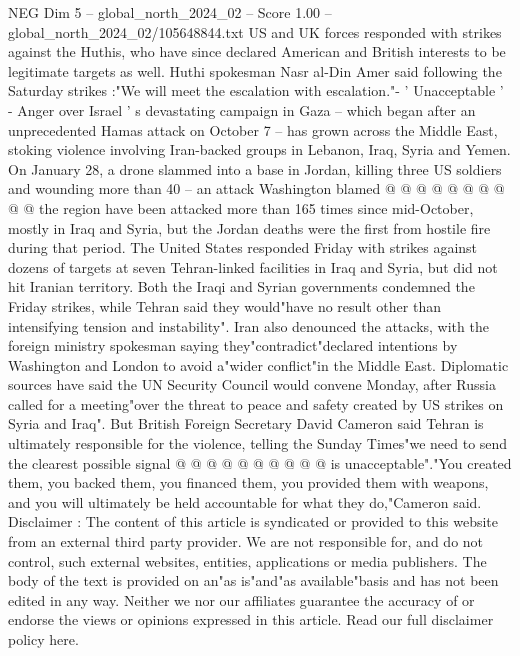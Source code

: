 \begin{textsample}{NEG Dim 5 – global\_north\_2024\_02 – Score 1.00 – global\_north\_2024\_02/105648844.txt}
US and UK forces responded with strikes against the Huthis, who have since declared American and British interests to be legitimate targets as well.
Huthi spokesman Nasr al-Din Amer said following the Saturday strikes :"We will meet the escalation with escalation."- ' Unacceptable ' - Anger over Israel ' s devastating campaign in Gaza -- which began after an unprecedented Hamas attack on October 7 -- has grown across the Middle East, stoking violence involving Iran-backed groups in Lebanon, Iraq, Syria and Yemen.
On January 28, a drone slammed into a base in Jordan, killing three US soldiers and wounding more than 40 -- an attack Washington blamed @ @ @ @ @ @ @ @ @ @ the region have been attacked more than 165 times since mid-October, mostly in Iraq and Syria, but the Jordan deaths were the first from hostile fire during that period.
The United States responded Friday with strikes against dozens of targets at seven Tehran-linked facilities in Iraq and Syria, but did not hit Iranian territory.
Both the Iraqi and Syrian governments condemned the Friday strikes, while Tehran said they would"have no result other than intensifying tension and instability".
Iran also denounced the attacks, with the foreign ministry spokesman saying they"contradict"declared intentions by Washington and London to avoid a"wider conflict"in the Middle East.
Diplomatic sources have said the UN Security Council would convene Monday, after Russia called for a meeting"over the threat to peace and safety created by US strikes on Syria and Iraq".
But British Foreign Secretary David Cameron said Tehran is ultimately responsible for the violence, telling the Sunday Times"we need to send the clearest possible signal @ @ @ @ @ @ @ @ @ @ is unacceptable"."You created them, you backed them, you financed them, you provided them with weapons, and you will ultimately be held accountable for what they do,"Cameron said.
Disclaimer : The content of this article is syndicated or provided to this website from an external third party provider.
We are not responsible for, and do not control, such external websites, entities, applications or media publishers.
The body of the text is provided on an"as is"and"as available"basis and has not been edited in any way.
Neither we nor our affiliates guarantee the accuracy of or endorse the views or opinions expressed in this article.
Read our full disclaimer policy here.

\end{textsample}
